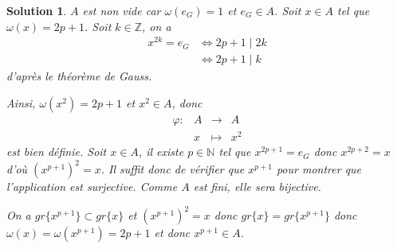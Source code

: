 \documentclass[12pt]{article}
\newtheorem{solution}{Solution}[section]
\theoremstyle{remark}
\newcommand{\N}{\mathbb{N}} \newcommand{\Z}{\mathbb{Z}}
\newcommand{\function}[5]{
	$$
	\begin{array}{rccl}
		#1: & #2 & \to & #3 \\
		& #4 & \mapsto & #5
	\end{array}
	$$
}
\numberwithin{equation}{section}
\begin{document}
\begin{solution}
	$A$ est non vide car $\omega(e_{G})=1$ et $e_{G}\in A$. Soit $x\in A$ tel que $\omega(x)=2p+1$. Soit $k\in\Z$, on a 
	\begin{align*}
		x^{2k}=e_{G}
		&\Leftrightarrow 2p+1\mid 2k\\
		&\Leftrightarrow 2p+1\mid k
	\end{align*}
	d'après le théorème de Gauss.

	Ainsi, $\omega(x^{2})=2p+1$ et $x^{2}\in A$, donc \function{\varphi}{A}{A}{x}{x^{2}} est bien définie. Soit $x\in A$, il existe $p\in\N$ tel que $x^{2p+1}=e_{G}$ donc $x^{2p+2}=x$ d'où $(x^{p+1})^{2}=x$. Il suffit donc de vérifier que $x^{p+1}$ pour montrer que l'application est surjective. Comme $A$ est fini, elle sera bijective.

	On a $gr\{x^{p+1}\}\subset gr\{x\}$ et $(x^{p+1})^{2}=x$ donc $gr\{x\}=gr\{x^{p+1}\}$ donc $\omega(x)=\omega(x^{p+1})=2p+1$ et donc $x^{p+1}\in A$.
\end{solution}
\end{document}
